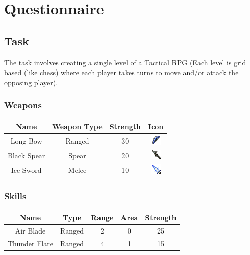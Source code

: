 \section{Questionnaire}
\subsection*{Task}

The task involves creating a single level of a Tactical RPG (Each level is grid based (like chess) where each player takes turns to move and/or attack the opposing player).   

\subsubsection*{Weapons}
\begin{center}
\begin{tabular}{c|c|c|c|}
	Name        & Weapon Type & Strength & Icon \\\hline
	Long Bow    & Ranged      & 30       & \includegraphics[height=0.5cm]{figures/bow.png}   \\ 
	Black Spear & Spear       & 20       & \includegraphics[height=0.5cm]{figures/spear.png} \\ 
	Ice Sword   & Melee       & 10       & \includegraphics[height=0.5cm]{figures/sword.png} \\ 
\end{tabular}
\end{center}

\subsubsection*{Skills}
\begin{center}
	\begin{tabular}{c|c|c|c|c}
		
		Name          & Type   & Range & Area & Strength \\\hline
		Air Blade     & Ranged & 2     & 0    & 25       \\ 
		Thunder Flare & Ranged & 4     & 1    & 15       \\ 
	\end{tabular}
\end{center}


